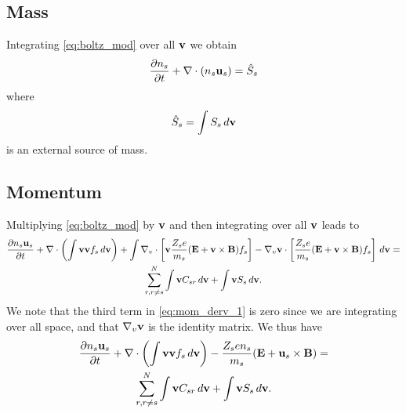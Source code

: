 \documentclass[a4paper,11pt]{report}
\begin{document}
\subsection{Mass}
Integrating \cref{eq:boltz_mod} over all $\mathbf{v}$ we obtain
\begin{equation}
\frac{\partial n_s}{\partial t} + \nabla \cdot \left ( n_s \mathbf{u}_s \right ) = \hat{S}_s
\end{equation}
where 
\begin{equation}
\hat{S}_s = \int S_s \, d\mathbf{v}
\end{equation}
is an external source of mass.

\subsection{Momentum}
Multiplying \cref{eq:boltz_mod} by $\mathbf{v}$ and then integrating over all $\mathbf{v}$ leads to
\begin{multline}
\label{eq:mom_derv_1}
\frac{\partial n_s \mathbf{u}_s}{\partial t} + \nabla \cdot \left ( \int \mathbf{v} \mathbf{v} f_s \, d\mathbf{v} \right) + \int \nabla_v \cdot \left [ \mathbf{v} \frac{Z_s e}{m_s} ( \mathbf{E} + \mathbf{v} \times \mathbf{B} ) f_s \right ] - \nabla_v \mathbf{v} \cdot \left [ \frac{Z_s e}{m_s} ( \mathbf{E} + \mathbf{v} \times \mathbf{B} ) f_s \right ] \, d\mathbf{v} =\\
\sum_{r, r \ne s}^N \int \mathbf{v} C_{s r} \, d\mathbf{v} + \int \mathbf{v} S_s \, d\mathbf{v}.
\end{multline}
We note that the third term in \cref{eq:mom_derv_1} is zero since we are integrating over all space, and that $\nabla_v \mathbf{v}$ is the identity matrix. We thus have
\begin{multline}
\label{eq:mom_derv_2}
\frac{\partial n_s \mathbf{u}_s}{\partial t} + \nabla \cdot \left ( \int \mathbf{v} \mathbf{v} f_s \, d\mathbf{v} \right) - \frac{Z_s e n_s}{m_s} ( \mathbf{E} + \mathbf{u}_s \times \mathbf{B} ) =\\
\sum_{r, r \ne s}^N \int \mathbf{v} C_{s r} \, d\mathbf{v} + \int \mathbf{v} S_s \, d\mathbf{v}.
\end{multline}
\end{document}
